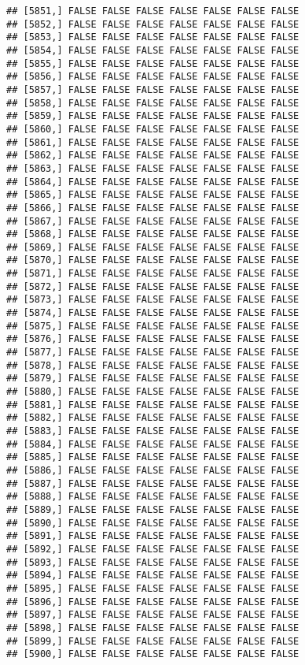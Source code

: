 \documentclass[
]{article}
\begin{document}
\begin{verbatim}
## [5851,] FALSE FALSE FALSE FALSE FALSE FALSE FALSE
## [5852,] FALSE FALSE FALSE FALSE FALSE FALSE FALSE
## [5853,] FALSE FALSE FALSE FALSE FALSE FALSE FALSE
## [5854,] FALSE FALSE FALSE FALSE FALSE FALSE FALSE
## [5855,] FALSE FALSE FALSE FALSE FALSE FALSE FALSE
## [5856,] FALSE FALSE FALSE FALSE FALSE FALSE FALSE
## [5857,] FALSE FALSE FALSE FALSE FALSE FALSE FALSE
## [5858,] FALSE FALSE FALSE FALSE FALSE FALSE FALSE
## [5859,] FALSE FALSE FALSE FALSE FALSE FALSE FALSE
## [5860,] FALSE FALSE FALSE FALSE FALSE FALSE FALSE
## [5861,] FALSE FALSE FALSE FALSE FALSE FALSE FALSE
## [5862,] FALSE FALSE FALSE FALSE FALSE FALSE FALSE
## [5863,] FALSE FALSE FALSE FALSE FALSE FALSE FALSE
## [5864,] FALSE FALSE FALSE FALSE FALSE FALSE FALSE
## [5865,] FALSE FALSE FALSE FALSE FALSE FALSE FALSE
## [5866,] FALSE FALSE FALSE FALSE FALSE FALSE FALSE
## [5867,] FALSE FALSE FALSE FALSE FALSE FALSE FALSE
## [5868,] FALSE FALSE FALSE FALSE FALSE FALSE FALSE
## [5869,] FALSE FALSE FALSE FALSE FALSE FALSE FALSE
## [5870,] FALSE FALSE FALSE FALSE FALSE FALSE FALSE
## [5871,] FALSE FALSE FALSE FALSE FALSE FALSE FALSE
## [5872,] FALSE FALSE FALSE FALSE FALSE FALSE FALSE
## [5873,] FALSE FALSE FALSE FALSE FALSE FALSE FALSE
## [5874,] FALSE FALSE FALSE FALSE FALSE FALSE FALSE
## [5875,] FALSE FALSE FALSE FALSE FALSE FALSE FALSE
## [5876,] FALSE FALSE FALSE FALSE FALSE FALSE FALSE
## [5877,] FALSE FALSE FALSE FALSE FALSE FALSE FALSE
## [5878,] FALSE FALSE FALSE FALSE FALSE FALSE FALSE
## [5879,] FALSE FALSE FALSE FALSE FALSE FALSE FALSE
## [5880,] FALSE FALSE FALSE FALSE FALSE FALSE FALSE
## [5881,] FALSE FALSE FALSE FALSE FALSE FALSE FALSE
## [5882,] FALSE FALSE FALSE FALSE FALSE FALSE FALSE
## [5883,] FALSE FALSE FALSE FALSE FALSE FALSE FALSE
## [5884,] FALSE FALSE FALSE FALSE FALSE FALSE FALSE
## [5885,] FALSE FALSE FALSE FALSE FALSE FALSE FALSE
## [5886,] FALSE FALSE FALSE FALSE FALSE FALSE FALSE
## [5887,] FALSE FALSE FALSE FALSE FALSE FALSE FALSE
## [5888,] FALSE FALSE FALSE FALSE FALSE FALSE FALSE
## [5889,] FALSE FALSE FALSE FALSE FALSE FALSE FALSE
## [5890,] FALSE FALSE FALSE FALSE FALSE FALSE FALSE
## [5891,] FALSE FALSE FALSE FALSE FALSE FALSE FALSE
## [5892,] FALSE FALSE FALSE FALSE FALSE FALSE FALSE
## [5893,] FALSE FALSE FALSE FALSE FALSE FALSE FALSE
## [5894,] FALSE FALSE FALSE FALSE FALSE FALSE FALSE
## [5895,] FALSE FALSE FALSE FALSE FALSE FALSE FALSE
## [5896,] FALSE FALSE FALSE FALSE FALSE FALSE FALSE
## [5897,] FALSE FALSE FALSE FALSE FALSE FALSE FALSE
## [5898,] FALSE FALSE FALSE FALSE FALSE FALSE FALSE
## [5899,] FALSE FALSE FALSE FALSE FALSE FALSE FALSE
## [5900,] FALSE FALSE FALSE FALSE FALSE FALSE FALSE

\end{verbatim}
\end{document}
